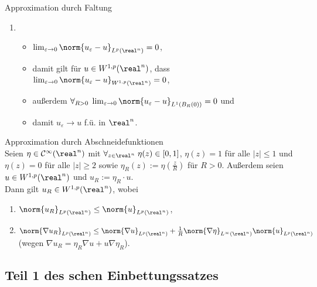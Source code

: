 \begin{Lemma}{Approximation durch Faltung}
\begin{enumerate}
        \item
        \begin{itemize}
            \item
            $\lim_{\varepsilon \to 0} \norm{u_\varepsilon - u}_{L^p(\real^n)} = 0$,
            
            \item
            damit gilt für $u \in W^{1,p}(\real^n)$, dass
            $\lim_{\varepsilon \to 0} \norm{u_\varepsilon - u}_{W^{1,p}(\real^n)} = 0$,
            
            \item
            außerdem $\forall_{R > 0}\; \lim_{\varepsilon \to 0}
            \norm{u_\varepsilon - u}_{L^1(B_R(0))} = 0$ und
            
            \item
            damit $u_\varepsilon \to u$ f.ü. in $\real^n$.
        \end{itemize}
    \end{enumerate}
\end{Lemma}

\begin{Lemma}{Approximation durch Abschneidefunktionen}\\
    Seien $\eta \in \C^\infty(\real^n)$ mit
    $\forall_{z \in \real^n}\; \eta(z) \in [0, 1]$,
    $\eta(z) = 1$ für alle $|z| \le 1$ und
    $\eta(z) = 0$ für alle $|z| \ge 2$
    sowie $\eta_R(z) := \eta(\frac{z}{R})$ für $R > 0$.
    Außerdem seien $u \in W^{1,p}(\real^n)$ und $u_R := \eta_R \cdot u$.\\
    Dann gilt $u_R \in W^{1,p}(\real^n)$, wobei
    \begin{enumerate}
        \item
        $\norm{u_R}_{L^p(\real^n)} \le \norm{u}_{L^p(\real^n)}$,
        
        \item
        $\norm{\nabla u_R}_{L^p(\real^n)} \le \norm{\nabla u}_{L^p(\real^n)} +
        \frac{1}{R} \norm{\nabla\eta}_{L^\infty(\real^n)} \norm{u}_{L^p(\real^n)}$
        (wegen $\nabla u_R = \eta_R \nabla u + u \nabla \eta_R$).
    \end{enumerate}
\end{Lemma}

\pagebreak

\subsection{%
    Teil 1 des schen Einbettungssatzes%
}

